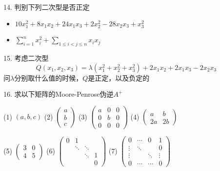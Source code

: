 \begin{frame}

14. 判别下列二次型是否正定
\begin{itemize}
\item[(1)] $10x_1^2 + 8x_1x_2 + 24x_1x_3 + 2x_2^2 - 28x_2x_3 + x_3^2$
\vspace{0.4em}
\item[(2)] $\sum\limits_{i=1}^n x_i^2 + \sum\limits_{1\le i<j\le n} x_ix_j$
\end{itemize}

\vspace{1em}

15. 考虑二次型
$$Q(x_1,x_2,x_3) = \lambda(x_1^2+x_2^2+x_3^2) + 2x_1x_2 + 2x_1x_3 - 2x_2x_3$$
问$\lambda$分别取什么值的时候，$Q$是正定，以及负定的

\end{frame}


\begin{frame}

16. 求以下矩阵的Moore-Penrose伪逆$A^+$

\vspace{0.5em}

(1) $(a,b,c)$ \quad (2) $\begin{pmatrix} a \\ b \\ c \end{pmatrix}$ \quad (3) $\begin{pmatrix} a & 0 & 0 \\ 0 & b & 0 \\ 0 & 0 & 0 \end{pmatrix}$ \quad (4) $\begin{pmatrix} a & b \\ 2a & 2b \end{pmatrix}$

\vspace{0.5em}

(5) $\begin{pmatrix} 3 & 0 \\ 4 & 5 \end{pmatrix}$ \quad (6) $\begin{pmatrix} 0 & 1 & & \\ & \ddots & \ddots & \\ & & \ddots & 1 \\ & & & 0 \end{pmatrix}$ \quad (7) $\begin{pmatrix} 0 & \cdots & 0 & 1 \\ \vdots & \ddots & & 0 \\ \vdots & & \ddots & \vdots \\ 0 & \cdots & \cdots & 0 \end{pmatrix}$

\end{frame}

